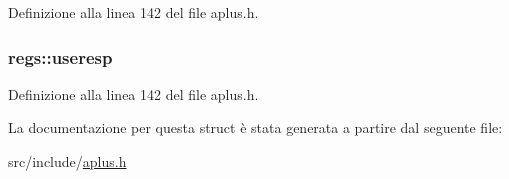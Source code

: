 Definizione alla linea 142 del file aplus.\+h.

\hypertarget{structregs_af7e777e1535d887de07a5bf3d11eb15f}{
\subsubsection[{useresp}]{ regs\+::useresp}}\label{structregs_af7e777e1535d887de07a5bf3d11eb15f}


Definizione alla linea 142 del file aplus.\+h.



La documentazione per questa struct è stata generata a partire dal seguente file\+:\begin{DoxyCompactItemize}
\item 
src/include/\hyperlink{aplus_8h}{aplus.\+h}\end{DoxyCompactItemize}
